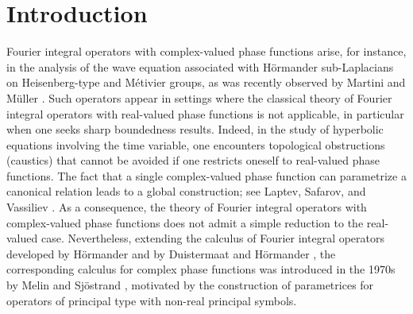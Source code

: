 \documentclass[12pt, reqno]{amsart}
\theoremstyle{definition}
\theoremstyle{remark}
\numberwithin{equation}{section}
\begin{document}
\begin{abstract} In this paper, we establish boundedness estimates for Fourier integral operators on Fourier Lebesgue spaces when the associated canonical relation is parametrised by a complex phase function. Our result constitutes the complex analogue of those obtained for real canonical relations by Rodino, Nicola, and Cordero. We prove that, under the spatial factorization condition of rank $\varkappa$, the corresponding Fourier integral operator is bounded on the Fourier Lebesgue space $\mathcal{F}L^p,$ provided that the order $m$ of the operator satisfies that
$ 
m \leq -\varkappa\left|\frac{1}{p}-\frac{1}{2}\right|, 1 \leq p \leq \infty.
$
This condition on the order $m$ is sharp.
\newline
\newline
\noindent \textit{Keywords.} Fourier integral operators, Fourier Lebesgue spaces,  Complex canonical relations.
\newline
\noindent \textit{2020 Mathematics Subject Classification.} Primary 35S30; Secondary 42B37.
\end{abstract} \maketitle
\allowdisplaybreaks
\tableofcontents


    
\section{Introduction}

Fourier integral operators with complex-valued phase functions arise, for instance, in the analysis of the wave equation associated with Hörmander sub-Laplacians on Heisenberg-type and Métivier groups, as was recently observed by Martini and Müller \cite{MMNG2023}. Such operators appear in settings where the classical theory of Fourier integral operators with real-valued phase functions is not applicable, in particular when one seeks sharp boundedness results. Indeed, in the study of hyperbolic equations involving the time variable, one encounters topological obstructions (caustics) that cannot be avoided if one restricts oneself to real-valued phase functions. The fact that a single complex-valued phase function can parametrize a canonical relation leads to a global construction; see Laptev, Safarov, and Vassiliev \cite{Laptev:Safarov:Vassiliev}. As a consequence, the theory of Fourier integral operators with complex-valued phase functions does not admit a simple reduction to the real-valued case. Nevertheless, extending the calculus of Fourier integral operators developed by Hörmander \cite{Hormander1971Ac} and by Duistermaat and Hörmander \cite{Duistermaat-Hormander:FIOs-2}, the corresponding calculus for complex phase functions was introduced in the 1970s by Melin and Sjöstrand \cite{Melin-Sjostrand1976}, motivated by the construction of parametrices for operators of principal type with non-real principal symbols.
\end{document}
